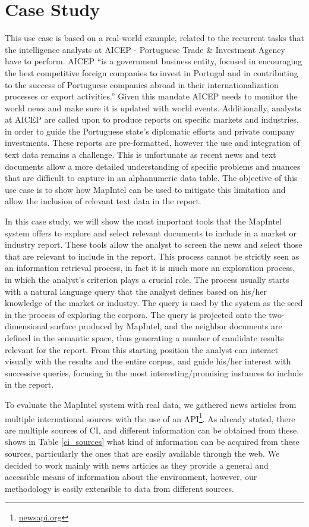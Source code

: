 \documentclass[a4paper]{article}
\begin{document}
\section{Case Study}
This use case is based on a real-world example, related to the recurrent tasks that the intelligence analysts at AICEP - Portuguese Trade \& Investment Agency have to perform. AICEP “is a government business entity, focused in encouraging the best competitive foreign companies to invest in Portugal and in contributing to the success of Portuguese companies abroad in their internationalization processes or export activities.” Given this mandate AICEP needs to monitor the world news and make sure it is updated with world events. Additionally, analysts at AICEP are called upon to produce reports on specific markets and industries, in order to guide the Portuguese state's diplomatic efforts and private company investments. These reports are pre-formatted, however the use and integration of text data remains a challenge. This is unfortunate as recent news and text documents allow a more detailed understanding of specific problems and nuances that are difficult to capture in an alphanumeric data table. The objective of this use case is to show how MapIntel can be used to mitigate this limitation and allow the inclusion of relevant text data in the report.

In this case study, we will show the most important tools that the MapIntel system offers to explore and select relevant documents to include in a market or industry report. These tools allow the analyst to screen the news and select those that are relevant to include in the report. This process cannot be strictly seen as an information retrieval process, in fact it is much more an exploration process, in which the analyst’s criterion plays a crucial role. The process usually starts with a natural language query that the analyst defines based on his/her knowledge of the market or industry. The query is used by the system as the seed in the process of exploring the corpora. The query is projected onto the two-dimensional surface produced by MapIntel, and the neighbor documents are defined in the semantic space, thus generating a number of candidate results relevant for the report. From this starting position the analyst can interact visually with the results and the entire corpus, and guide his/her interest with successive queries, focusing in the most interesting/promising instances to include in the report.

To evaluate the MapIntel system with real data, we gathered news articles from multiple international sources with the use of an API\footnote{\href{https://newsapi.org/}{newsapi.org}}. As already stated, there are multiple sources of CI, and different information can be obtained from these. \citet{dey2011} shows in Table \ref{ci_sources} what kind of information can be acquired from these sources, particularly the ones that are easily available through the web. We decided to work mainly with news articles as they provide a general and accessible means of information about the environment, however, our methodology is easily extensible to data from different sources.
\end{document}
